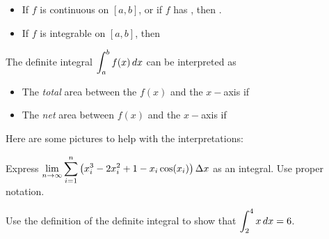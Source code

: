 \documentclass[notes]{subfiles}
\begin{document}
		\begin{rmk}
			\begin{itemize}
				\setlength\itemsep{25pt}
					\item If \(f\) is continuous on \([a,b]\), or if \(f\) has ,\vspace{20pt} then .			
						
					\item If \(f\) is integrable on \([a,b]\), then\vspace{25pt}
			\end{itemize}
		\end{rmk}
		
		\begin{rmk}
			The definite integral $\displaystyle \int_a^b f(x)\, dx$ can be interpreted as\vspace{5pt}
				\begin{itemize}
				\setlength\itemsep{30pt}
					\item The \emph{total} area between the $f(x)$ and the $x-$axis if 
					\item The \emph{net} area between $f(x)$ and the $x-$axis if \vspace{20pt} 
				\end{itemize}
			
		\end{rmk}
		Here are some pictures to help with the interpretations:

			\newpage
			
		\begin{ex}
			Express \(\displaystyle \lim_{n\to \infty} \sum_{i = 1}^n \left( x_i^3 - 2x_i^2 + 1 - x_i\cos(x_i)\right)\Delta x\) as an integral.  Use proper notation.
		\end{ex}
			
		\begin{ex}
			Use the definition of the definite integral to show that \(\displaystyle \int_2^4 x\, dx = 6\).
		\end{ex}
			\newpage
\end{document}
